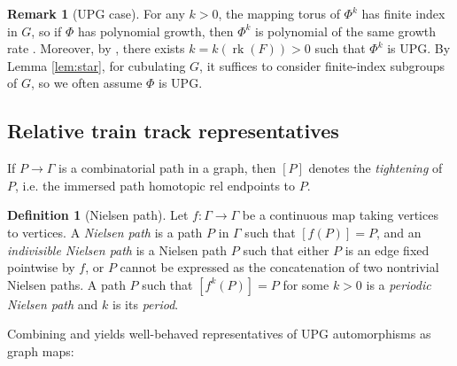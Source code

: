 \documentclass[11pt,oneside]{amsart}
\theoremstyle{definition}
\newtheorem{defn}[thm]{Definition}
\newtheorem{rem}[thm]{Remark}
\DeclareMathOperator{\rank}{rk}
\begin{document}
\begin{rem}[UPG case]\label{rem:make-upg}
For any $k>0$, the mapping torus of $\Phi^k$ has finite index in $G$, so if $\Phi$ has polynomial growth, then $\Phi^k$ 
is polynomial of the same growth rate \cite{Macura:detour}.  
Moreover, by \cite[Cor. 5.7.6]{BFH:tits-I}, there exists 
$k=k(\rank(F))>0$ such that $\Phi^k$ is UPG. By Lemma \ref{lem:star}, for cubulating $G$, it suffices to consider finite-index subgroups of $G$, so we often assume $\Phi$ is UPG.  
\end{rem}

\subsection{Relative train track representatives}\label{subsubsec:RTTM}
If $P\to\Gamma$ is a combinatorial path in a graph, then $[P]$ denotes the \emph{tightening} of $P$, i.e. the immersed 
path homotopic rel endpoints to $P$. 

\begin{defn}[Nielsen path]\label{defn:Nielsen}
Let $f:\Gamma\to\Gamma$ be a continuous map taking vertices to vertices.  A \emph{Nielsen path} is a path $P$ in $\Gamma$ such that 
$[f(P)]=P$, and an \emph{indivisible Nielsen path} is a Nielsen path $P$ such that either $P$ is an edge fixed pointwise by $f$, or $P$ cannot be expressed as the concatenation of two nontrivial Nielsen paths.  A path $P$ such that $[f^k(P)]=P$ for some $k>0$ is a \emph{periodic Nielsen path} and $k$ is its \emph{period}.
\end{defn}

Combining \cite[Thm. 5.1.5]{BFH:tits-I} and \cite[Prop. 3.12]{BFH:kolchin} yields well-behaved representatives of UPG automorphisms as graph maps:
\end{document}
